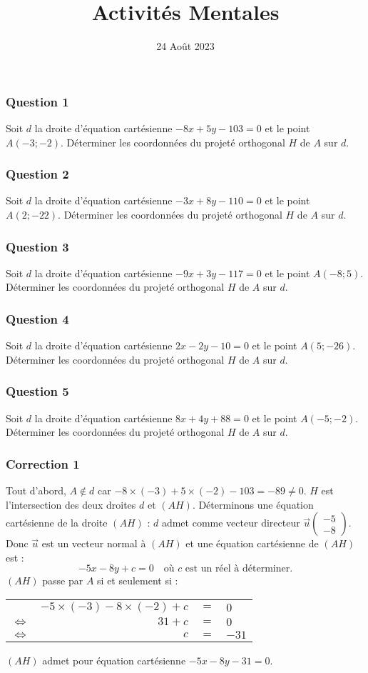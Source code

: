 \documentclass[15pt, mathserif]{beamer}
\title{Activités Mentales}
\date{24 Août 2023}
\newenvironment{Eq}{\begin{center}\begin{tabular}{rrcl}}{\end{tabular}\end{center}}
\newcommand{\ligneq}[2]{$\Longleftrightarrow$ & $#1$ & $=$ & $#2$ \\}
\newcommand{\Ligneq}[2]{ & $#1$ & $=$ & $#2$ \\}
\begin{document}
\begin{frame}
    \titlepage
\end{frame}

\begin{frame} 
	\frametitle{Question 1}
Soit $d$ la droite d'équation cartésienne $-8x+5y-103=0$ et le point $A(-3;-2)$. 
 Déterminer les coordonnées du projeté orthogonal $H$ de $A$ sur $d$.\end{frame}


\begin{frame} 
	\frametitle{Question 2}
Soit $d$ la droite d'équation cartésienne $-3x+8y-110=0$ et le point $A(2;-22)$. 
 Déterminer les coordonnées du projeté orthogonal $H$ de $A$ sur $d$.\end{frame}


\begin{frame} 
	\frametitle{Question 3}
Soit $d$ la droite d'équation cartésienne $-9x+3y-117=0$ et le point $A(-8;5)$. 
 Déterminer les coordonnées du projeté orthogonal $H$ de $A$ sur $d$.\end{frame}


\begin{frame} 
	\frametitle{Question 4}
Soit $d$ la droite d'équation cartésienne $2x-2y-10=0$ et le point $A(5;-26)$. 
 Déterminer les coordonnées du projeté orthogonal $H$ de $A$ sur $d$.\end{frame}


\begin{frame} 
	\frametitle{Question 5}
Soit $d$ la droite d'équation cartésienne $8x+4y+88=0$ et le point $A(-5;-2)$. 
 Déterminer les coordonnées du projeté orthogonal $H$ de $A$ sur $d$.\end{frame}


\begin{frame}
\vspace{-10mm}
	\frametitle{Correction 1}
\vspace*{0.5cm} 
 Tout d'abord, $A \notin d$ car $-8\times \left(-3\right)+5\times \left(-2\right)-103=-89 \neq0$. 
 $H$ est l'intersection des deux droites $d$ et $(AH)$. 
 Déterminons une équation cartésienne de la droite $(AH)$ :   $d$ admet comme vecteur directeur $\vec{u} \begin{pmatrix} -5 \\ -8\end{pmatrix}$. Donc $\vec{u}$ est un vecteur normal à $(AH)$ et une équation cartésienne de $(AH)$ est : $$ -5x -8y+c=0 \quad \text{où $c$ est un réel à déterminer.}$$ $(AH)$ passe par $A$ si et seulement si :
 \begin{Eq} 
 	 \Ligneq{-5\times \left(-3\right)-8\times \left(-2\right)+c}{0} 
 	 \ligneq{31+c}{0} 
 	 \ligneq{c}{-31} 
 \end{Eq} $(AH)$ admet pour équation cartésienne $-5x -8y-31=0$. 
 
 \end{frame} 
 
\end{document}
